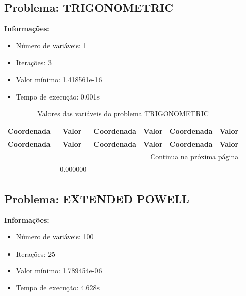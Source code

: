 \documentclass[12pt]{article}
\begin{document}
\newpage            
\subsection{Problema: TRIGONOMETRIC}

\textbf{Informações:}
\begin{itemize}
\item Número de variáveis: 1
\item Iterações: 3
\item Valor mínimo: 1.418561e-16
\item Tempo de execução: 0.001s
\end{itemize}

\small
\begin{longtable}{@{}cc|cc|cc@{}}
\caption{Valores das variáveis do problema TRIGONOMETRIC} \\
\toprule
\textbf{Coordenada} & \textbf{Valor} & \textbf{Coordenada} & \textbf{Valor} & \textbf{Coordenada} & \textbf{Valor} \\
\midrule
\endfirsthead

\toprule
\textbf{Coordenada} & \textbf{Valor} & \textbf{Coordenada} & \textbf{Valor} & \textbf{Coordenada} & \textbf{Valor} \\
\midrule
\endhead

\midrule \multicolumn{6}{r}{{Continua na próxima página}} \\ \midrule
\endfoot

\bottomrule
\endlastfoot
1 & -0.000000 &  &  &  &  \\

\end{longtable}


\newpage            
\subsection{Problema: EXTENDED POWELL}

\textbf{Informações:}
\begin{itemize}
\item Número de variáveis: 100
\item Iterações: 25
\item Valor mínimo: 1.789454e-06
\item Tempo de execução: 4.628s
\end{itemize}
\end{document}
